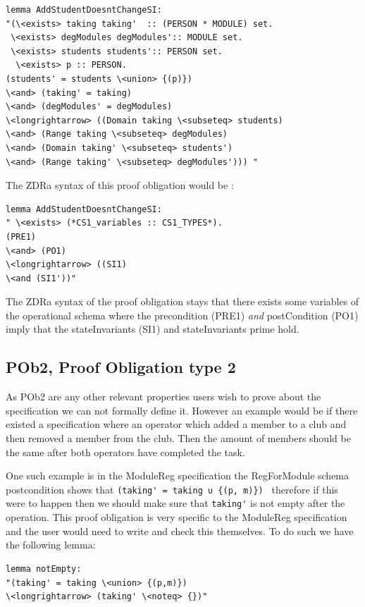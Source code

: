 \begin{verbatim}
lemma AddStudentDoesntChangeSI:
"(\<exists> taking taking'  :: (PERSON * MODULE) set.
 \<exists> degModules degModules':: MODULE set.
 \<exists> students students':: PERSON set.
  \<exists> p :: PERSON.
(students' = students \<union> {(p)}) 
\<and> (taking' = taking)
\<and> (degModules' = degModules)
\<longrightarrow> ((Domain taking \<subseteq> students)
\<and> (Range taking \<subseteq> degModules)
\<and> (Domain taking' \<subseteq> students')
\<and> (Range taking' \<subseteq> degModules'))) "
\end{verbatim}

The ZDRa syntax of this proof obligation would be :

\begin{verbatim}
lemma AddStudentDoesntChangeSI:
" \<exists> (*CS1_variables :: CS1_TYPES*).
(PRE1)
\<and> (PO1)
\<longrightarrow> ((SI1)
\<and (SI1'))"
\end{verbatim}

 The ZDRa syntax of the proof obligation stays that there exists some variables
 of the operational schema where the precondition (PRE1) \emph{and}
 postCondition (PO1) imply that the stateInvariants (SI1) and stateInvariants
 prime hold.

\subsection{POb2, Proof Obligation type 2}

As POb2 are any other relevant properties users wish to prove about the
specification we can not formally define it. However an example would be if
there existed a specification where an operator which added a member to a club
and then removed a member from the club. Then the amount of members should be
the same after both operators have completed the task.

One such example is in the ModuleReg specification the RegForModule schema
postcondition shows that \verb|(taking' = taking ∪ {(p, m)}) | therefore if this
were to happen then we should make sure that \verb|taking'| is not empty after
the operation. This proof obligation is very specific to the ModuleReg
specification and the user would need to write and check this themselves. To do
such we have the following lemma:

\begin{verbatim}
lemma notEmpty:
"(taking' = taking \<union> {(p,m)}) 
\<longrightarrow> (taking' \<noteq> {})"
\end{verbatim}

